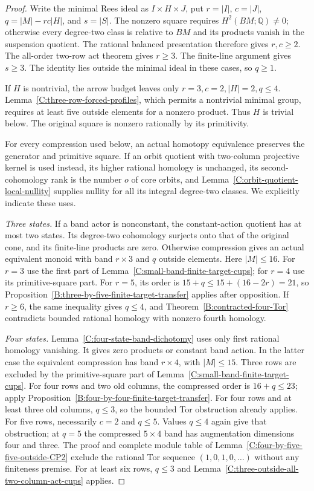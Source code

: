 \begin{proof}
Write the minimal Rees ideal as $I\times H\times J$, put
$r=|I|$, $c=|J|$, $q=|M|-rc|H|$, and $s=|S|$.
The nonzero square requires $H^2(BM;\mathbb Q)\ne0$; otherwise
every degree-two class is relative to $BM$ and its products vanish
in the suspension quotient. The rational balanced presentation
therefore gives $r,c\geq2$. The all-order two-row act theorem gives
$r\geq3$. The finite-line argument gives $s\geq3$. The identity
lies outside the minimal ideal in these cases, so $q\geq1$.

If $H$ is nontrivial, the arrow budget leaves only
$r=3,c=2,|H|=2,q\leq4$. Lemma~\ref{C:three-row-forced-profiles},
which permits a nontrivial minimal group, requires at least five
outside elements for a nonzero product. Thus $H$ is trivial below.
The original square is nonzero rationally by its primitivity.

For every compression used below, an actual homotopy equivalence
preserves the generator and primitive square. If an orbit quotient
with two-column projective kernel is used instead, its higher
rational homology is unchanged, its second-cohomology rank is the
number $o$ of core orbits, and
Lemma~\ref{C:orbit-quotient-local-nullity} supplies nullity for all
its integral degree-two classes. We explicitly indicate these uses.

\emph{Three states.}
If a band actor is nonconstant, the constant-action quotient has at
most two states. Its degree-two cohomology surjects onto that of the
original cone, and its finite-line products are zero. Otherwise
compression gives an actual equivalent monoid with band $r\times3$
and $q$ outside elements. Here $|M|\leq16$.
For $r=3$ use the first part of
Lemma~\ref{C:small-band-finite-target-cups}; for $r=4$ use its
primitive-square part. For $r=5$, its order is
$15+q\leq15+(16-2r)=21$, so
Proposition~\ref{B:three-by-five-finite-target-transfer} applies after
opposition. If $r\geq6$, the same inequality gives $q\leq4$,
and Theorem~\ref{B:contracted-four-Tor} contradicts bounded
rational homology with nonzero fourth homology.

\emph{Four states.}
Lemma~\ref{C:four-state-band-dichotomy} uses only first rational
homology vanishing. It gives zero products or constant band action.
In the latter case the equivalent compression has band $r\times4$,
with $|M|\leq15$. Three rows are excluded by the primitive-square
part of Lemma~\ref{C:small-band-finite-target-cups}.
For four rows and two old columns, the compressed order is
$16+q\leq23$; apply
Proposition~\ref{B:four-by-four-finite-target-transfer}.
For four rows and at least three old columns, $q\leq3$, so the
bounded Tor obstruction already applies. For five rows, necessarily
$c=2$ and $q\leq5$. Values $q\leq4$ again give that obstruction;
at $q=5$ the compressed $5\times4$ band has augmentation dimensions
four and three. The proof and complete module table of
Lemma~\ref{C:four-by-five-five-outside-CP2} exclude the rational
Tor sequence $(1,0,1,0,\ldots)$ without any finiteness premise.
For at least six rows, $q\leq3$ and
Lemma~\ref{C:three-outside-all-two-column-act-cups} applies.


\end{proof}
